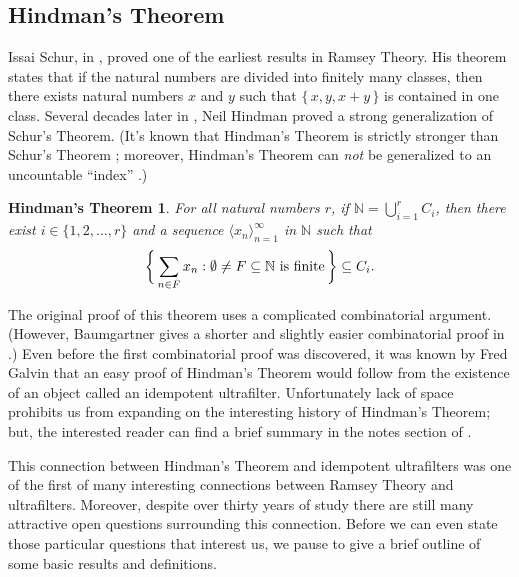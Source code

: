 \documentclass[12pt]{article}
\theoremstyle{plain}
\newtheorem{fst}[thm]{Hindman's Theorem}
\theoremstyle{definition}
\newcommand{\bbN}{\mathbb{N}}
\newcommand{\la}{\langle}
\newcommand{\ra}{\rangle}
\begin{document}
\subsection{Hindman's Theorem}
Issai Schur, in \cite{Schur:1916fk}, proved one of the earliest
results in Ramsey Theory.
His theorem states that if the natural numbers are divided into
finitely many classes, then there exists natural numbers $x$ and $y$
such that $\{\,x, y, x+y\,\}$ is contained in one class.
Several decades later in \cite{Hindman:1974ys}, Neil Hindman proved a
strong generalization of Schur's Theorem.
(It's known that Hindman's Theorem is strictly stronger than Schur's
Theorem \cite[Theorems 16.28 and 16.29]{Hindman:1998fk}; moreover,
Hindman's Theorem can \textsl{not} be generalized to an uncountable
``index'' \cite{Milliken:1978fk}.)
\begin{fst}
  For all natural numbers $r$, if \/ $\bbN = \bigcup_{i=1}^r C_i$,
  then there exist $i \in \{1, 2, \ldots, r\}$ and a sequence $\la x_n
  \ra_{n=1}^\infty$ in $\bbN$ such that
  \[
    \biggl\{\, \sum_{n \in F} x_n : \hbox{$\emptyset \ne F \subseteq
      \bbN$ is finite} \,\biggr\} \subseteq C_i.
  \]
\end{fst}

The original proof of this theorem uses a complicated combinatorial
argument. 
(However, Baumgartner gives a shorter and slightly easier
combinatorial proof in \cite{Baumgartner:1974uq}.)
Even before the first combinatorial proof was discovered, it was known
by Fred Galvin that an easy proof of Hindman's Theorem would follow
from the existence of an object called an idempotent ultrafilter.
Unfortunately lack of space prohibits us from expanding on the
interesting history of Hindman's Theorem; but, the interested reader
can find a brief summary in the notes section of \cite[Chapter
5]{Hindman:1998fk}.

This connection between Hindman's Theorem and idempotent ultrafilters
was one of the first of many interesting connections between Ramsey
Theory and ultrafilters.
Moreover, despite over thirty years of study there are still many
attractive open questions surrounding this connection. 
Before we can even state those particular questions that interest us,
we pause to give a brief outline of some basic results and
definitions. 
\end{document}
